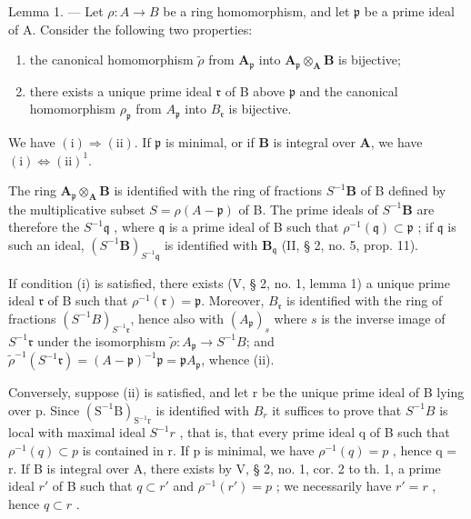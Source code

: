 Lemma 1. — Let \(\rho: A \to B\) be a ring homomorphism, and let \(\mathfrak{p}\) be a prime ideal of A. Consider the following two properties:

\begin{enumerate}
\def\labelenumi{(\roman{enumi})}
\item
  the canonical homomorphism \(\tilde{\rho}\) from \(\mathbf{A}_{\mathfrak{p}}\) into \(\mathbf{A}_{\mathfrak{p}} \otimes_{\mathbf{A}} \mathbf{B}\) is bijective;
\item
  there exists a unique prime ideal \(\mathfrak{r}\) of B above \(\mathfrak{p}\) and the canonical homomorphism \(\rho_{\mathfrak{p}}\) from \(A_{\mathfrak{p}}\) into \(B_{\mathfrak{r}}\) is bijective.
\end{enumerate}

We have \((\mathrm{i}) \Rightarrow (\mathrm{ii})\). If \(\mathfrak{p}\) is minimal, or if \(\mathbf{B}\) is integral over \(\mathbf{A}\), we have \((\mathrm{i}) \Leftrightarrow (\mathrm{ii})^{1}\).

The ring \(\mathbf{A}_{\mathfrak{p}} \otimes_{\mathbf{A}} \mathbf{B}\) is identified with the ring of fractions \(S^{-1} \mathbf{B}\) of B defined by the multiplicative subset \(S = \rho(A - \mathfrak{p})\) of B. The prime ideals of \(S^{-1} \mathbf{B}\) are therefore the \(S^{-1} \mathfrak{q}\) , where \(\mathfrak{q}\) is a prime ideal of B such that \(\rho^{-1}(\mathfrak{q}) \subset \mathfrak{p}\) ; if \(\mathfrak{q}\) is such an ideal, \((S^{-1} \mathbf{B})_{S^{-1} \mathfrak{q}}\) is identified with \(\mathbf{B}_{\mathfrak{q}}\) (II, § 2, no. 5, prop. 11).

If condition (i) is satisfied, there exists (V, § 2, no. 1, lemma 1) a unique prime ideal \(\mathfrak{r}\) of B such that \(\rho^{-1}(\mathfrak{r}) = \mathfrak{p}\). Moreover, \(B_{\mathfrak{r}}\) is identified with the ring of fractions \((S^{-1}B)_{S^{-1}\mathfrak{r}}\), hence also with \((A_{\mathfrak{p}})_{s}\) where \(s\) is the inverse image of \(S^{-1}\mathfrak{r}\) under the isomorphism \(\tilde{\rho}: A_{\mathfrak{p}} \to S^{-1}B\); and \(\tilde{\rho}^{-1}(S^{-1}\mathfrak{r}) = (A - \mathfrak{p})^{-1}\mathfrak{p} = \mathfrak{p}A_{\mathfrak{p}}\), whence (ii).

Conversely, suppose (ii) is satisfied, and let r be the unique prime ideal of B lying over p. Since \((\mathrm{S}^{-1}\mathrm{B})_{\mathrm{S}^{-1}\mathrm{r}}\) is identified with \(B_{r}\) it suffices to prove that \(S^{-1}B\) is local with maximal ideal \(S^{-1}r\) , that is, that every prime ideal q of B such that \(\rho^{-1}(q) \subset p\) is contained in r. If p is minimal, we have \(\rho^{-1}(q) = p\) , hence q = r. If B is integral over A, there exists by V, § 2, no. 1, cor. 2 to th. 1, a prime ideal \(r'\) of B such that \(q \subset r'\) and \(\rho^{-1}(r') = p\) ; we necessarily have \(r' = r\) , hence \(q \subset r\) .

